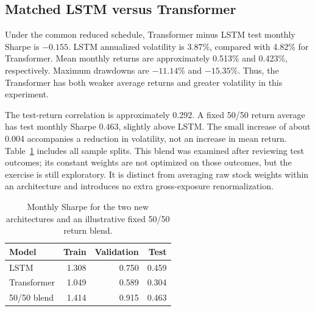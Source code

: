 \documentclass[11pt]{article}
\begin{document}
\subsection{Matched LSTM versus Transformer}
Under the common reduced schedule, Transformer minus LSTM test monthly Sharpe is $-0.155$. LSTM annualized volatility is 3.87\%, compared with 4.82\% for Transformer. Mean monthly returns are approximately 0.513\% and 0.423\%, respectively. Maximum drawdowns are $-11.14\%$ and $-15.35\%$. Thus, the Transformer has both weaker average returns and greater volatility in this experiment.

The test-return correlation is approximately 0.292. A fixed 50/50 return average has test monthly Sharpe 0.463, slightly above LSTM. The small increase of about 0.004 accompanies a reduction in volatility, not an increase in mean return. Table~\ref{tab:blend} includes all sample splits. This blend was examined after reviewing test outcomes; its constant weights are not optimized on those outcomes, but the exercise is still exploratory. It is distinct from averaging raw stock weights within an architecture and introduces no extra gross-exposure renormalization.
\begin{table}[htbp]\centering\small
\caption{Monthly Sharpe for the two new architectures and an illustrative fixed 50/50 return blend.}\label{tab:blend}
\begin{tabular}{lrrr}
\toprule
Model & Train & Validation & Test \\
\midrule
LSTM & 1.308 & 0.750 & 0.459 \\
Transformer & 1.049 & 0.589 & 0.304 \\
50/50 blend & 1.414 & 0.915 & 0.463 \\
\bottomrule\end{tabular}\end{table}
\end{document}
